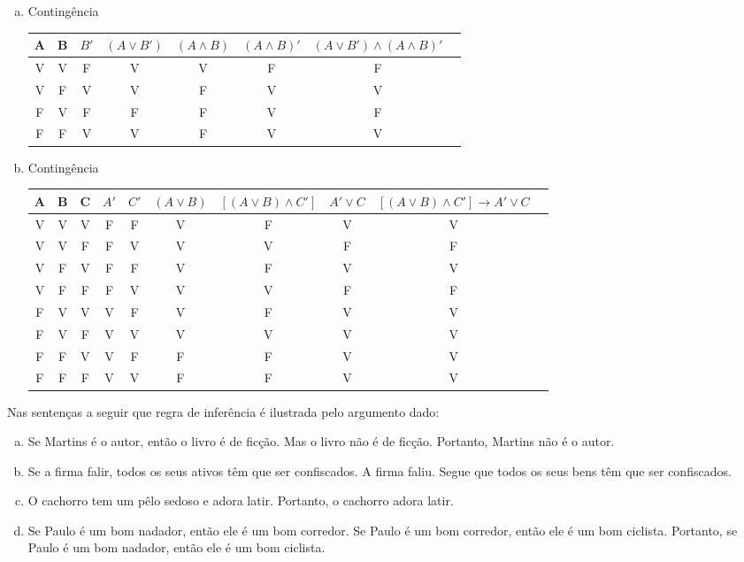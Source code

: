 \documentclass[a4paper, 12pt, addpoints]{exam}
\begin{document}
\begin{questions}
\begin{resp}
\begin{enumerate}[a)]
      \item Contingência \\
      \begin{tabular}{|c|c|c|c|c|c|c|c|}
        \hline
        A & B & $B'$ & $(A \lor B')$ & $(A \land B)$ & $(A \land B)'$ & $(A \lor B') \land (A \land B)'$ \\
        \hline
        V & V & F & V & V & F & F \\
        V & F & V & V & F & V & V \\
        F & V & F & F & F & V & F \\
        F & F & V & V & F & V & V \\
        \hline
      \end{tabular}

      \item Contingência \\
      \begin{tabular}{|c|c|c|c|c|c|c|c|c|c|}
        \hline
        A & B & C & $A'$ & $C'$ & $(A \lor B)$ & $[(A \lor B) \land C']$ & $A' \lor C$ & $[(A \lor B) \land C'] \rightarrow A' \lor C$ \\
        \hline
        V & V & V & F & F & V & F & V & V \\
        V & V & F & F & V & V & V & F & F \\
        V & F & V & F & F & V & F & V & V \\
        V & F & F & F & V & V & V & F & F \\
        F & V & V & V & F & V & F & V & V \\
        F & V & F & V & V & V & V & V & V \\
        F & F & V & V & F & F & F & V & V \\
        F & F & F & V & V & F & F & V & V \\
        \hline
      \end{tabular}
    \end{enumerate}
  \end{resp}

  \question Nas sentenças a seguir que regra de inferência é ilustrada pelo argumento dado:
  \begin{enumerate}[a)]
    \item Se Martins é o autor, então o livro é de ficção. Mas o livro não é de ficção. Portanto,
          Martins não é o autor.
    \item Se a firma falir, todos os seus ativos têm que ser confiscados. A firma faliu. Segue
          que todos os seus bens têm que ser confiscados.
    \item O cachorro tem um pêlo sedoso e adora latir. Portanto, o cachorro adora latir.
    \item Se Paulo é um bom nadador, então ele é um bom corredor. Se Paulo é um bom
          corredor, então ele é um bom ciclista. Portanto, se Paulo é um bom nadador, então ele
          é um bom ciclista.
  \end{enumerate}


\end{questions}
\end{document}

